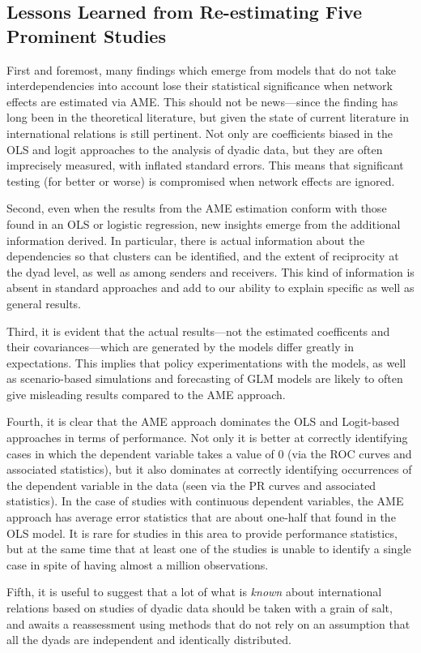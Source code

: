 \subsection{Lessons Learned from Re-estimating Five Prominent Studies}

First and foremost, many  findings which emerge from models that do not take interdependencies into account lose their statistical significance when network effects are estimated via AME. This should not be news---since the finding has long been in the theoretical literature, but given the state of current literature in international relations is still pertinent.  Not only
are coefficients biased in the OLS and logit approaches to the analysis of dyadic data, but they are often imprecisely measured, with inflated standard errors.  This means that significant testing (for better or worse) is compromised when network effects are ignored.

Second, even when the results from the AME estimation conform with those found in an OLS or logistic regression, new insights
emerge from the additional information derived. In particular, there is actual information about the dependencies so that clusters can be identified, and the extent of reciprocity at the dyad level, as well as among senders and receivers.  This kind of information
is absent in standard approaches and add to our ability to explain specific as well as general results.

Third, it is evident that the actual results---not the estimated coefficents and their covariances---which are generated by the models differ greatly in expectations.  This implies that policy experimentations with the models, as well as scenario-based simulations and forecasting of GLM models are likely to often give misleading results compared to the AME approach.

Fourth, it is clear that the AME approach dominates the OLS and Logit-based approaches in terms of performance. Not only it is better at correctly identifying cases in which the dependent variable takes a value of $0$ (via the ROC curves and associated statistics), but it also dominates at correctly identifying occurrences of the dependent variable in the data (seen via the PR curves and associated statistics).  In the case of studies
with continuous dependent variables, the AME approach has average error statistics that are about one-half that found in the OLS model. It is rare for studies in this area to provide performance statistics, but at the same time that at least one of the studies is unable to identify a single case in spite of having almost a million observations.

Fifth, it is useful to suggest that a lot of what is \textit{known} about international relations based on studies of dyadic data should be taken with a grain of salt, and awaits a reassessment using methods that do not rely on an assumption that all the dyads are independent and identically distributed.


